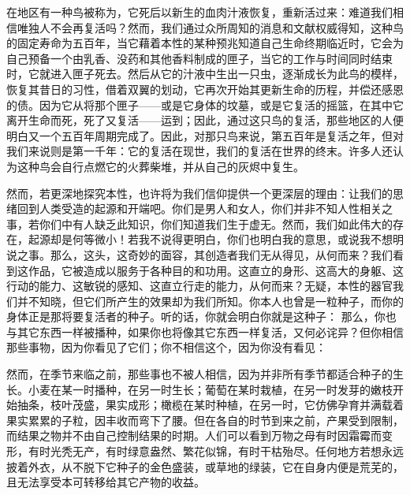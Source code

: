 在地区有一种鸟被称为，它死后以新生的血肉汁液恢复，重新活过来：难道我们相信唯独人不会再复活吗？然而，我们通过众所周知的消息和文献权威得知，这种鸟的固定寿命为五百年，当它藉着本性的某种预兆知道自己生命终期临近时，它会为自己预备一个由乳香、没药和其他香料制成的匣子，当它的工作与时间同时结束时，它就进入匣子死去。然后从它的汁液中生出一只虫，逐渐成长为此鸟的模样，恢复其昔日的习性，借着双翼的划动，它再次开始其更新生命的历程，并偿还感恩的债。因为它从将那个匣子——或是它身体的坟墓，或是它复活的摇篮，在其中它离开生命而死，死了又复活——运到；因此，通过这只鸟的复活，那些地区的人便明白又一个五百年周期完成了。因此，对那只鸟来说，第五百年是复活之年，但对我们来说则是第一千年：它的复活在现世，我们的复活在世界的终末。许多人还认为这种鸟会自行点燃它的火葬柴堆，并从自己的灰烬中复生。\par

然而，若更深地探究本性，也许将为我们信仰提供一个更深层的理由：让我们的思绪回到人类受造的起源和开端吧。你们是男人和女人，你们并非不知人性相关之事，若你们中有人缺乏此知识，你们知道我们生于虚无。然而，我们如此伟大的存在，起源却是何等微小！若我不说得更明白，你们也明白我的意思，或说我不想明说之事。那么，这头，这奇妙的面容，其创造者我们无从得见，从何而来？我们看到这作品，它被造成以服务于各种目的和功用。这直立的身形、这高大的身躯、这行动的能力、这敏锐的感知、这直立行走的能力，从何而来？无疑，本性的器官我们并不知晓，但它们所产生的效果却为我们所知。你本人也曾是一粒种子，而你的身体正是那将要复活者的种子。听的话，你就会明白你就是这种子：  那么，你也与其它东西一样被播种，如果你也将像其它东西一样复活，又何必诧异？但你相信那些事物，因为你看见了它们；你不相信这个，因为你没有看见： \par

然而，在季节来临之前，那些事也不被人相信，因为并非所有季节都适合种子的生长。小麦在某一时播种，在另一时生长；葡萄在某时栽植，在另一时发芽的嫩枝开始抽条，枝叶茂盛，果实成形；橄榄在某时种植，在另一时，它仿佛孕育并满载着果实累累的子粒，因丰收而弯下了腰。但在各自的时节到来之前，产果受到限制，而结果之物并不由自己控制结果的时期。人们可以看到万物之母有时因霜霉而变形，有时光秃无产，有时绿意盎然、繁花似锦，有时干枯殆尽。任何地方若想永远披着外衣，从不脱下它种子的金色盛装，或草地的绿装，它在自身内便是荒芜的，且无法享受本可转移给其它产物的收益。\par


